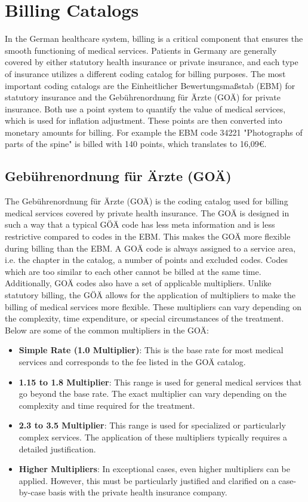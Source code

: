\section{Billing Catalogs}
In the German healthcare system, billing is a critical component that ensures the smooth functioning of medical services.
Patients in Germany are generally covered by either statutory health insurance or private insurance, and each type of insurance
utilizes a different coding catalog for billing purposes.
The most important coding catalogs are the Einheitlicher Bewertungsmaßstab (EBM) for statutory insurance and the Gebührenordnung für Ärzte (GOÄ) for private insurance.
Both use a point system to quantify the value of medical services, which is used for inflation adjustment.
These points are then converted into monetary amounts for billing.
For example the EBM code 34221 "Photographs of parts of the spine" is billed with 140 points, which translates to 16,09€.


\subsection{Gebührenordnung für Ärzte (GOÄ)}
The Gebührenordnung für Ärzte (GOÄ) is the coding catalog used for billing medical services covered by private health insurance.
The GOÄ is designed in such a way that a typical GÖÄ code has less meta information and is less restrictive compared to codes in the EBM.
This makes the GOÄ more flexible during billing than the EBM.
A GOÄ code is always assigned to a service area, i.e. the chapter in the catalog, a number of points and excluded codes.
Codes which are too similar to each other cannot be billed at the same time.
Additionally, GOÄ codes also have a set of applicable multipliers.
Unlike statutory billing, the GÖÄ allows for the application of multipliers to make the billing of medical services more flexible.
These multipliers can vary depending on the complexity, time expenditure, or special circumstances of the treatment.
Below are some of the common multipliers in the GOÄ:

\begin{itemize}
    \item \textbf{Simple Rate (1.0 Multiplier)}: This is the base rate for most medical services and corresponds to the fee listed in the GOÄ catalog.
    \item \textbf{1.15 to 1.8 Multiplier}: This range is used for general medical services that go beyond the base rate.
    The exact multiplier can vary depending on the complexity and time required for the treatment.
    \item \textbf{2.3 to 3.5 Multiplier}: This range is used for specialized or particularly complex services.
    The application of these multipliers typically requires a detailed justification.
    \item \textbf{Higher Multipliers}: In exceptional cases, even higher multipliers can be applied.
    However, this must be particularly justified and clarified on a case-by-case basis with the private health insurance company.
\end{itemize}

